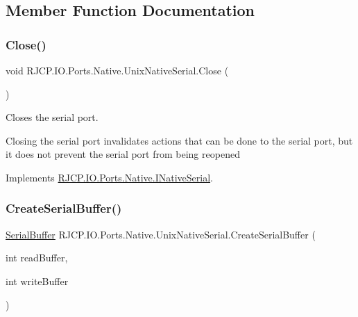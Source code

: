 \subsection{Member Function Documentation}
\mbox{\label{class_r_j_c_p_1_1_i_o_1_1_ports_1_1_native_1_1_unix_native_serial_aa1f5e5c1b74fbac54b63578c9a43ac86}} 
\subsubsection{\texorpdfstring{Close()}{Close()}}
{\footnotesize\ttfamily void R\+J\+C\+P.\+I\+O.\+Ports.\+Native.\+Unix\+Native\+Serial.\+Close (\begin{DoxyParamCaption}{ }\end{DoxyParamCaption})}



Closes the serial port. 

Closing the serial port invalidates actions that can be done to the serial port, but it does not prevent the serial port from being reopened 

Implements \mbox{\hyperlink{interface_r_j_c_p_1_1_i_o_1_1_ports_1_1_native_1_1_i_native_serial_adb88604917c61a951ee180962aa81ce1}{R\+J\+C\+P.\+I\+O.\+Ports.\+Native.\+I\+Native\+Serial}}.

\mbox{\label{class_r_j_c_p_1_1_i_o_1_1_ports_1_1_native_1_1_unix_native_serial_ae5f713e425dbe5c51cbabd4ed2367869}} 
\subsubsection{\texorpdfstring{CreateSerialBuffer()}{CreateSerialBuffer()}}
{\footnotesize\ttfamily \mbox{\hyperlink{class_r_j_c_p_1_1_i_o_1_1_ports_1_1_native_1_1_serial_buffer}{Serial\+Buffer}} R\+J\+C\+P.\+I\+O.\+Ports.\+Native.\+Unix\+Native\+Serial.\+Create\+Serial\+Buffer (\begin{DoxyParamCaption}\item[{int}]{read\+Buffer,  }\item[{int}]{write\+Buffer }\end{DoxyParamCaption})}



